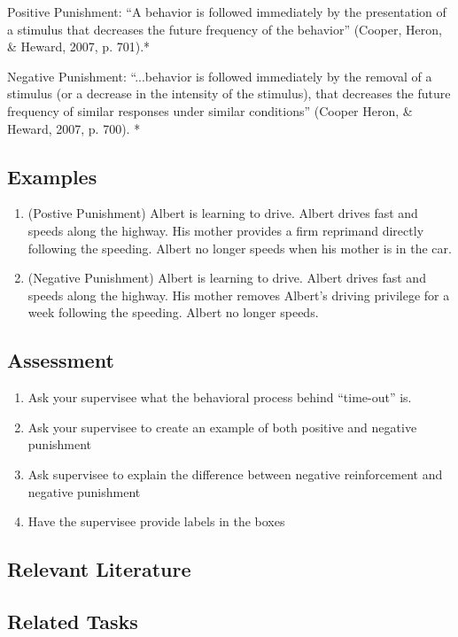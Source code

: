 Positive Punishment: ``A behavior is followed immediately by the presentation of a stimulus that decreases the future frequency of the behavior'' (Cooper, Heron, \& Heward, 2007, p. 701).*

Negative Punishment: ``...behavior is followed immediately by the removal of a stimulus (or a decrease in the intensity of the stimulus), that decreases the future frequency of similar responses under similar conditions'' (Cooper Heron, \& Heward, 2007, p. 700). *

\subsection{Examples}
\begin{enumerate}
\item (Postive Punishment) Albert is learning to drive.  Albert drives fast and speeds along the highway.  His mother provides a firm reprimand directly following the speeding.  Albert no longer speeds when his mother is in the car. 
\item (Negative Punishment) Albert is learning to drive.  Albert drives fast and speeds along the highway.  His mother removes Albert's driving privilege for a week following the speeding.  Albert no longer speeds.
\end{enumerate}
%
\subsection{Assessment}
\begin{enumerate}
\item Ask your supervisee what the behavioral process behind ``time-out'' is. 
\item Ask your supervisee to create an example of both positive and negative punishment
\item Ask supervisee to explain the difference between negative reinforcement and negative punishment
\item Have the supervisee provide labels in the boxes
\end{enumerate}
%
\subsection{Relevant Literature}
\begin{refsection}
\nocite{bailey2013ethics,
    cooper2007applied,
    foxx1982decreasing,
    van1988right}
\printbibliography[heading=none]
\end{refsection} 
%
\subsection{Related Tasks}
\fourdOne{}\\
\fourdSeventeen{}\\
\fourdNineteen{}\\
\foureEleven{}\\
\fourgSeven{}\\
\fourjTen{}\\
\fourFKNineteen{}\\
\fourFKTwenty{}\\
%
